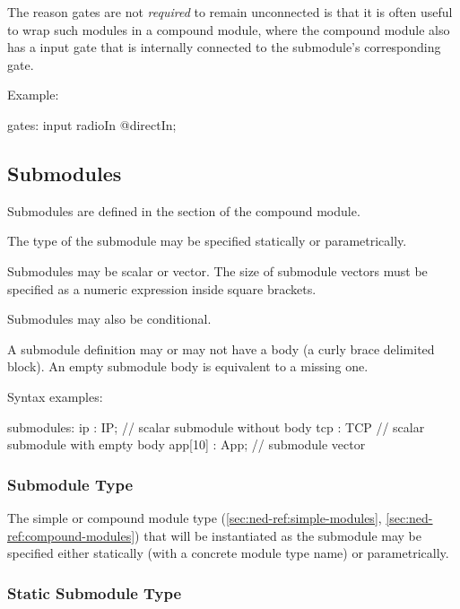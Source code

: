\begin{note}
    The reason  gates are not \textit{required} to remain
    unconnected is that it is often useful to wrap such modules in a compound
    module, where the compound module also has a  input gate
    that is internally connected to the submodule's corresponding gate.
\end{note}

Example:

\begin{ned}
gates:
    input radioIn @directIn;
\end{ned}



\subsection{Submodules}
\label{sec:ned-ref:submodules}

Submodules are defined in the  section of the compound
module.

The type of the submodule may be specified statically or parametrically.

Submodules may be scalar or vector. The size of submodule vectors must be
specified as a numeric expression inside square brackets.

Submodules may also be conditional.

A submodule definition may or may not have a body (a curly brace
delimited block). An empty submodule body is equivalent to a
missing one.

Syntax examples:
\begin{ned}
submodules:
    ip : IP;         // scalar submodule without body
    tcp : TCP {}     // scalar submodule with empty body
    app[10] : App;   // submodule vector
\end{ned}


\subsubsection{Submodule Type}
\label{sec:ned-ref:submodule-type}

The simple or compound module type (\ref{sec:ned-ref:simple-modules},
\ref{sec:ned-ref:compound-modules}) that will be instantiated as the
submodule may be specified either statically (with a concrete module type
name) or parametrically.


\subsubsection{Static Submodule Type}
\label{sec:ned-ref:static-submodule-type}

